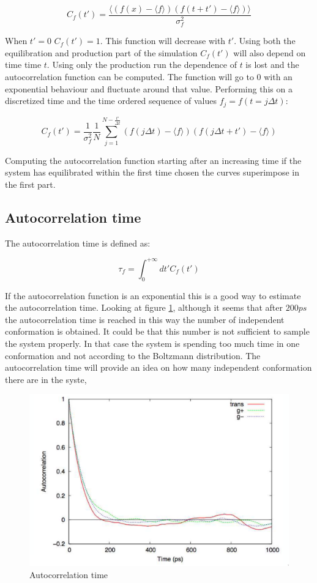 	$$C_f(t') = \frac{\bigl\langle(f(x)-\langle f\rangle)(f(t+t') - \langle f\rangle)\bigr\rangle}{\sigma^2_f}$$

	When $t'=0$ $C_f(t') = 1$.
	This function will decrease with $t'$.
	Using both the equilibration and production part of the simulation $C_f(t')$ will also depend on time time $t$.
	Using only the production run the dependence of $t$ is lost and the autocorrelation function can be computed.
	The function will go to $0$ with an exponential behaviour and fluctuate around that value.
	Performing this on a discretized time and the time ordered sequence of values $f_j = f(t=j\Delta t)$:

	$$C_f(t') = \frac{1}{\sigma^2_f}\frac{1}{N}\sum\limits_{j=1}^{N-\frac{t'}{\Delta t}}(f(j\Delta t)-\langle f\rangle)(f(j\Delta t + t')-\langle f\rangle)$$

	Computing the autocorrelation function starting after an increasing time if the system has equilibrated within the first time chosen the curves superimpose in the first part.

	\subsection{Autocorrelation time}
	The autocorrelation time is defined as:

	$$\tau_f = \int_0^{+\infty} dt' C_f(t')$$

	If the autocorrelation function is an exponential this is a good way to estimate the autocorrelation time.
	Looking at figure \ref{fig:autocorrelation-time}, although it seems that after $200ps$ the autocorrelation time is reached in this way the number of independent conformation is obtained.
	It could be that this number is not sufficient to sample the system properly.
	In that case the system is spending too much time in one conformation and not according to the Boltzmann distribution.
	The autocorrelation time will provide an idea on how many independent conformation there are in the syste,

	\begin{figure}[H]
		\includegraphics[width = \textwidth]{autocorrelation-time}
		\caption{Autocorrelation time}
		\label{fig:autocorrelation-time}
	\end{figure}


